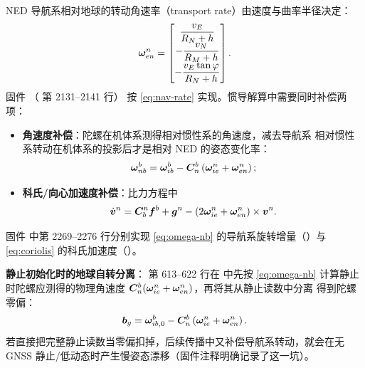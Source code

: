 NED 导航系相对地球的转动角速率（transport rate）由速度与曲率半径决定：
\begin{equation}
  \boldsymbol{\omega}_{en}^n = \begin{bmatrix}
    \dfrac{v_E}{R_N + h} \\[1ex]
    -\dfrac{v_N}{R_M + h} \\[1ex]
    -\dfrac{v_E\tan\varphi}{R_N + h}
  \end{bmatrix}.
  \label{eq:nav-rate}
\end{equation}
固件 （ 第 2131--2141 行）
按 \cref{eq:nav-rate} 实现。惯导解算中需要同时补偿两项：
\begin{itemize}
  \item \textbf{角速度补偿}：陀螺在机体系测得相对惯性系的角速度，减去导航系
    相对惯性系转动在机体系的投影后才是相对 NED 的姿态变化率：
    \begin{equation}
      \boldsymbol{\omega}_{nb}^b = \boldsymbol{\omega}_{ib}^b
        - \boldsymbol{C}_n^b\left(\boldsymbol{\omega}_{ie}^n + \boldsymbol{\omega}_{en}^n\right);
      \label{eq:omega-nb}
    \end{equation}
  \item \textbf{科氏/向心加速度补偿}：比力方程中
    \begin{equation}
      \dot{\boldsymbol{v}}^n = \boldsymbol{C}_b^n\boldsymbol{f}^b + \boldsymbol{g}^n
        - \left(2\boldsymbol{\omega}_{ie}^n + \boldsymbol{\omega}_{en}^n\right)\times\boldsymbol{v}^n.
      \label{eq:coriolis}
    \end{equation}
\end{itemize}
固件  中第 2269--2276 行分别实现
\cref{eq:omega-nb} 的导航系旋转增量（）与
\cref{eq:coriolis} 的科氏加速度（）。

\begin{remark}
\textbf{静止初始化时的地球自转分离}： 第 613--622 行在
 中先按 \cref{eq:omega-nb} 计算静止时陀螺应测得的物理角速度
$\boldsymbol{C}_n^b(\boldsymbol{\omega}_{ie}^n + \boldsymbol{\omega}_{en}^n)$，再将其从静止读数中分离
得到陀螺零偏：
\begin{equation}
  \boldsymbol{b}_g = \boldsymbol{\omega}_{ib,0}^b - \boldsymbol{C}_n^b\left(\boldsymbol{\omega}_{ie}^n
    + \boldsymbol{\omega}_{en}^n\right).
  \label{eq:init-gyro-bias}
\end{equation}
若直接把完整静止读数当零偏扣掉，后续传播中又补偿导航系转动，就会在无 GNSS
静止/低动态时产生慢姿态漂移（固件注释明确记录了这一坑）。
\end{remark}

